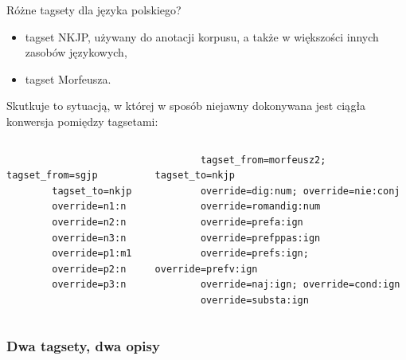 \documentclass[xcolor=dvipsnames,polish]{beamer}
\begin{document}
\begin{frame}[fragile]{Różne tagsety dla języka polskiego?}
  \begin{itemize}
    \item tagset NKJP, używany do anotacji korpusu, a także w większości innych zasobów językowych,
    \item tagset Morfeusza.
  \end{itemize}
  \vspace{0.5cm}

  Skutkuje to sytuacją, w której w sposób niejawny dokonywana jest ciągła konwersja pomiędzy tagsetami:
  \begin{columns}[c]
      \footnotesize
      \begin{verbatim}
        tagset_from=sgjp
        tagset_to=nkjp
        override=n1:n
        override=n2:n
        override=n3:n
        override=p1:m1
        override=p2:n
        override=p3:n
      \end{verbatim}
      \footnotesize
      \begin{verbatim}
        tagset_from=morfeusz2; tagset_to=nkjp
        override=dig:num; override=nie:conj
        override=romandig:num
        override=prefa:ign
        override=prefppas:ign
        override=prefs:ign; override=prefv:ign
        override=naj:ign; override=cond:ign
        override=substa:ign
      \end{verbatim}
    \end{columns}
\end{frame}

\begin{frame}
  \frametitle{Dwa tagsety, dwa opisy}
\end{frame}
\end{document}
